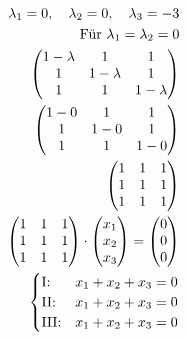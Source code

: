 \begin{align*}
    \lambda_1 = 0, \quad \lambda_2 = 0, \quad \lambda_3 = -3 \\
    \text{Für } \lambda_1 = \lambda_2 = 0                    \\
    \begin{pmatrix}
        1 - \lambda & 1           & 1           \\
        1           & 1 - \lambda & 1           \\
        1           & 1           & 1 - \lambda
    \end{pmatrix}                  \\
    \begin{pmatrix}
        1 - 0 & 1     & 1     \\
        1     & 1 - 0 & 1     \\
        1     & 1     & 1 - 0
    \end{pmatrix}                                    \\
    \begin{pmatrix}
        1 & 1 & 1 \\
        1 & 1 & 1 \\
        1 & 1 & 1
    \end{pmatrix}                                           \\
    \begin{pmatrix}
        1 & 1 & 1 \\
        1 & 1 & 1 \\
        1 & 1 & 1
    \end{pmatrix} \cdot \begin{pmatrix}
                            x_1 \\ x_2 \\ x_3
                        \end{pmatrix} = \begin{pmatrix}
                                            0 \\ 0 \\ 0
                                        \end{pmatrix}       \\
    \begin{cases}
        \text{I:\@}   & x_1 + x_2 + x_3 = 0 \\
        \text{II:\@}  & x_1 + x_2 + x_3 = 0 \\
        \text{III:\@} & x_1 + x_2 + x_3 = 0 \\
    \end{cases}
\end{align*}


